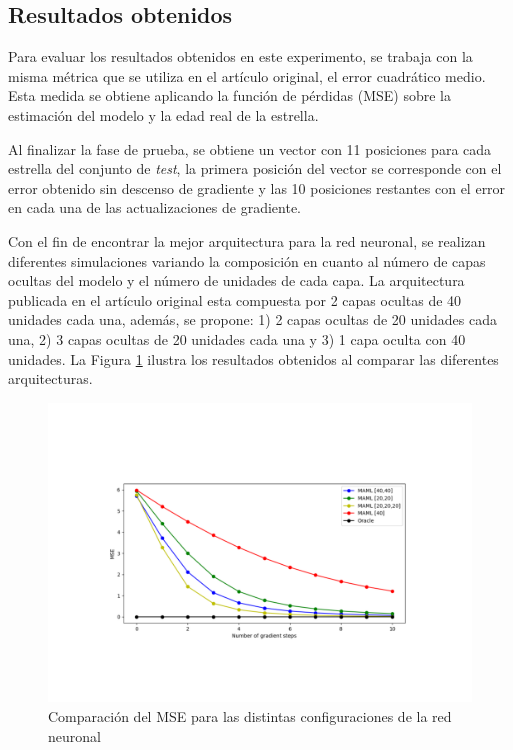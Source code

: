 \subsection{Resultados obtenidos} 

Para evaluar los resultados obtenidos en este experimento, se trabaja con la misma métrica que se utiliza en el artículo original, el error cuadrático medio. Esta medida se obtiene aplicando la función de pérdidas (MSE) sobre la estimación del modelo y la edad real de la estrella. 

Al finalizar la fase de prueba, se obtiene un vector con 11 posiciones para cada estrella del conjunto de \emph{test}, la primera posición del vector se corresponde con el error obtenido sin descenso de gradiente y las 10 posiciones restantes con el error en cada una de las actualizaciones de gradiente.


Con el fin de encontrar la mejor arquitectura para la red neuronal, se realizan diferentes simulaciones variando la composición en cuanto al número de capas ocultas del modelo y el número de unidades de cada capa. La arquitectura publicada en el artículo original esta compuesta por 2 capas ocultas de 40 unidades cada una, además, se propone: 1) 2 capas ocultas de 20 unidades cada una, 2) 3 capas ocultas de 20 unidades cada una y 3) 1 capa oculta con 40 unidades.
La Figura \ref{fig:mse_nnet} ilustra los resultados obtenidos al comparar las diferentes arquitecturas.

\begin{figure}[H]
\begin{center}
 \includegraphics[width=0.8\linewidth]{Figuras/MAML/MSE.pdf}
\end{center}
\caption{Comparación del MSE para las distintas configuraciones de la red neuronal}
 \label{fig:mse_nnet}
\end{figure}

